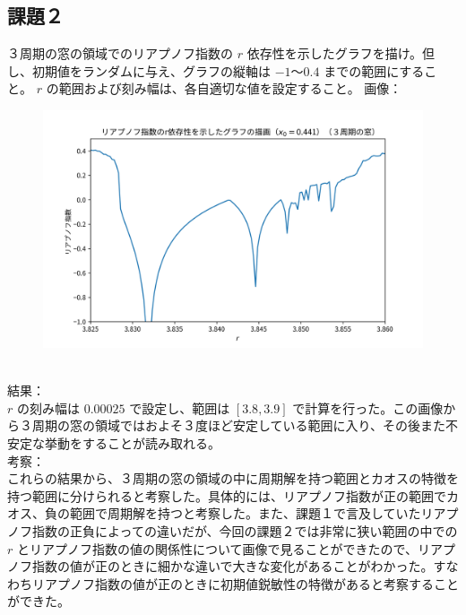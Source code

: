 \subsection{課題２}
３周期の窓の領域でのリアプノフ指数の $r$ 依存性を示したグラフを描け。但し、初期値をランダムに与え、グラフの縦軸は $-1 〜 0.4$ までの範囲にすること。 $r$ の範囲および刻み幅は、各自適切な値を設定すること。
画像：\\
\begin{figure}[htbp]
  \centering
  \includegraphics[keepaspectratio, scale=0.5]{images/Problem4/task4_2.png}
\end{figure}\\

結果：\\
$r$ の刻み幅は $0.00025$ で設定し、範囲は $[3.8, 3.9]$ で計算を行った。この画像から３周期の窓の領域ではおよそ３度ほど安定している範囲に入り、その後また不安定な挙動をすることが読み取れる。\\

考察：\\
これらの結果から、３周期の窓の領域の中に周期解を持つ範囲とカオスの特徴を持つ範囲に分けられると考察した。具体的には、リアプノフ指数が正の範囲でカオス、負の範囲で周期解を持つと考察した。また、課題１で言及していたリアプノフ指数の正負によっての違いだが、今回の課題２では非常に狭い範囲の中での $r$ とリアプノフ指数の値の関係性について画像で見ることができたので、リアプノフ指数の値が正のときに細かな違いで大きな変化があることがわかった。すなわちリアプノフ指数の値が正のときに初期値鋭敏性の特徴があると考察することができた。

\newpage
